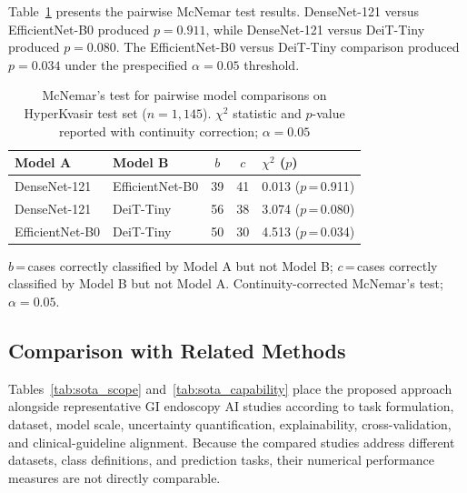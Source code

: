 \documentclass[11pt,a4paper]{article}
\begin{document}
Table~\ref{tab:mcnemar} presents the pairwise McNemar test results.
DenseNet-121 versus EfficientNet-B0 produced $p=0.911$, while DenseNet-121
versus DeiT-Tiny produced $p=0.080$. The EfficientNet-B0 versus DeiT-Tiny
comparison produced $p=0.034$ under the prespecified $\alpha=0.05$ threshold.

\begin{table}[H]
\centering
\caption{McNemar's test for pairwise model comparisons on HyperKvasir test set
  ($n=1{,}145$). $\chi^2$ statistic and $p$-value reported with continuity
  correction; $\alpha=0.05$}
\label{tab:mcnemar}
\begin{tabular}{llccl}
\toprule
\textbf{Model A} & \textbf{Model B} & $b$ & $c$ & $\chi^2$ ($p$)\\
\midrule
DenseNet-121    & EfficientNet-B0 & 39 & 41 & 0.013 ($p$\,=\,0.911)\\
DenseNet-121    & DeiT-Tiny       & 56 & 38 & 3.074 ($p$\,=\,0.080)\\
EfficientNet-B0 & DeiT-Tiny       & 50 & 30 & 4.513 ($p$\,=\,0.034)\\
\bottomrule
\end{tabular}
\par\smallskip
{\footnotesize $b$\,=\,cases correctly classified by Model A but not Model B;
  $c$\,=\,cases correctly classified by Model B but not Model A.
  Continuity-corrected McNemar's test; $\alpha=0.05$.}
\end{table}

\subsection{Comparison with Related Methods}

Tables~\ref{tab:sota_scope} and~\ref{tab:sota_capability} place the proposed
approach alongside representative GI endoscopy AI studies according to task
formulation, dataset, model scale, uncertainty quantification,
explainability, cross-validation, and clinical-guideline alignment. Because
the compared studies address different datasets, class definitions, and
prediction tasks, their numerical performance measures are not directly
comparable.
\end{document}
